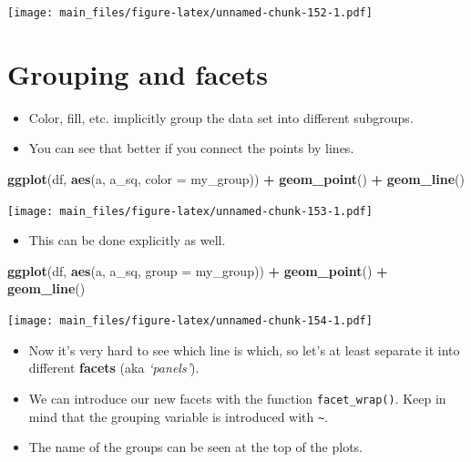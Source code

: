 \documentclass[
]{book}
\newenvironment{Shaded}{\begin{snugshade}}{\end{snugshade}}
\newcommand{\AttributeTok}[1]{\textcolor[rgb]{0.13,0.29,0.53}{#1}}
\newcommand{\FunctionTok}[1]{\textcolor[rgb]{0.13,0.29,0.53}{\textbf{#1}}}
\newcommand{\NormalTok}[1]{#1}
\newcommand{\SpecialCharTok}[1]{\textcolor[rgb]{0.81,0.36,0.00}{\textbf{#1}}}
\providecommand{\tightlist}{%
  \setlength{\itemsep}{0pt}\setlength{\parskip}{0pt}}
\begin{document}
\texttt{[image: main\_files/figure-latex/unnamed-chunk-152-1.pdf]}

\hypertarget{grouping-and-facets}{%
\section{Grouping and facets}\label{grouping-and-facets}}

\begin{itemize}
\tightlist
\item
  Color, fill, etc. implicitly group the data set into different subgroups.
\item
  You can see that better if you connect the points by lines.
\end{itemize}

\begin{Shaded}
\begin{Highlighting}[]
\FunctionTok{ggplot}\NormalTok{(df, }\FunctionTok{aes}\NormalTok{(a, a\_sq, }\AttributeTok{color =}\NormalTok{ my\_group)) }\SpecialCharTok{+} \FunctionTok{geom\_point}\NormalTok{()  }\SpecialCharTok{+} \FunctionTok{geom\_line}\NormalTok{()}
\end{Highlighting}
\end{Shaded}

\texttt{[image: main\_files/figure-latex/unnamed-chunk-153-1.pdf]}

\begin{itemize}
\tightlist
\item
  This can be done explicitly as well.
\end{itemize}

\begin{Shaded}
\begin{Highlighting}[]
\FunctionTok{ggplot}\NormalTok{(df, }\FunctionTok{aes}\NormalTok{(a, a\_sq, }\AttributeTok{group =}\NormalTok{ my\_group)) }\SpecialCharTok{+} \FunctionTok{geom\_point}\NormalTok{()  }\SpecialCharTok{+} \FunctionTok{geom\_line}\NormalTok{()}
\end{Highlighting}
\end{Shaded}

\texttt{[image: main\_files/figure-latex/unnamed-chunk-154-1.pdf]}

\begin{itemize}
\tightlist
\item
  Now it's very hard to see which line is which, so let's at least separate it into different \textbf{facets} (aka \emph{`panels'}).
\item
  We can introduce our new facets with the function \texttt{facet\_wrap()}. Keep in mind that the grouping variable is introduced with \texttt{\textasciitilde{}}.
\item
  The name of the groups can be seen at the top of the plots.
\end{itemize}
\end{document}
